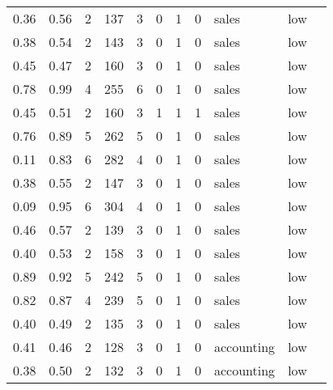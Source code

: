 \documentclass[11pt]{article}
\begin{document}
\begin{tabular}{r|llllllllll}
	 0.36       & 0.56       & 2          & 137        & 3          & 0          & 1          & 0          & sales      & low       \\
	 0.38       & 0.54       & 2          & 143        & 3          & 0          & 1          & 0          & sales      & low       \\
	 0.45       & 0.47       & 2          & 160        & 3          & 0          & 1          & 0          & sales      & low       \\
	 0.78       & 0.99       & 4          & 255        & 6          & 0          & 1          & 0          & sales      & low       \\
	 0.45       & 0.51       & 2          & 160        & 3          & 1          & 1          & 1          & sales      & low       \\
	 0.76       & 0.89       & 5          & 262        & 5          & 0          & 1          & 0          & sales      & low       \\
	 0.11       & 0.83       & 6          & 282        & 4          & 0          & 1          & 0          & sales      & low       \\
	 0.38       & 0.55       & 2          & 147        & 3          & 0          & 1          & 0          & sales      & low       \\
	 0.09       & 0.95       & 6          & 304        & 4          & 0          & 1          & 0          & sales      & low       \\
	 0.46       & 0.57       & 2          & 139        & 3          & 0          & 1          & 0          & sales      & low       \\
	 0.40       & 0.53       & 2          & 158        & 3          & 0          & 1          & 0          & sales      & low       \\
	 0.89       & 0.92       & 5          & 242        & 5          & 0          & 1          & 0          & sales      & low       \\
	 0.82       & 0.87       & 4          & 239        & 5          & 0          & 1          & 0          & sales      & low       \\
	 0.40       & 0.49       & 2          & 135        & 3          & 0          & 1          & 0          & sales      & low       \\
	 0.41       & 0.46       & 2          & 128        & 3          & 0          & 1          & 0          & accounting & low       \\
	 0.38       & 0.50       & 2          & 132        & 3          & 0          & 1          & 0          & accounting & low       \\

\end{tabular}
\end{document}
